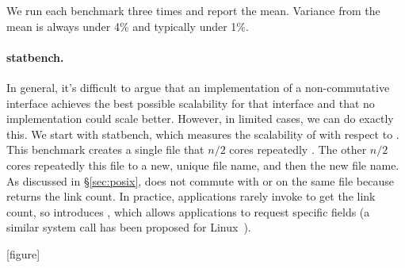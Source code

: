We run each benchmark three times and report the mean.  Variance from
the mean is always under 4\% and typically under 1\%.  


\paragraph{statbench.} In general, it's difficult to argue that an
implementation of a
non-commutative interface achieves the best possible scalability for
that interface and that no implementation could scale better.  However,
in limited cases, we can do exactly this.  We start with statbench,
which measures the scalability of  with respect to
.  This benchmark creates a single file that $n/2$ cores
repeatedly . The other $n/2$ cores repeatedly
 this file to a new, unique file name, and then 
the new file name.  As discussed in \S\ref{sec:posix},  does not
commute with  or  on the same file because
 returns the link count.  In practice,
applications rarely invoke  to get the link count, so \sys
introduces , which allows applications to request specific
fields (a similar system call has been proposed for
Linux~\cite{linux:xstat}).


[figure]
\renewcommand{\themysubfigure}{\thefigure(\alph{mysubfigure})}


